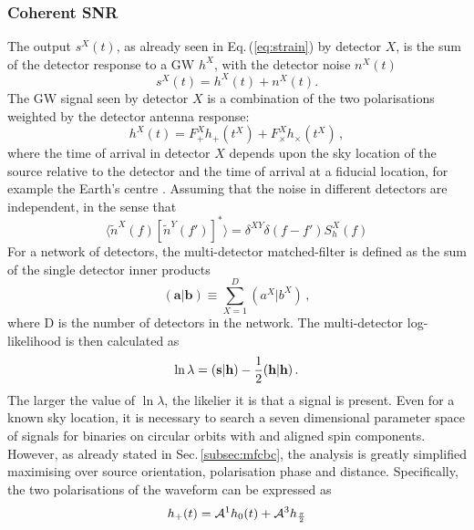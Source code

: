 \documentclass[binding=0.6cm, LaM]{sapthesis}
\begin{document}
\subsubsection{Coherent SNR}	
	The output $s^X(t)$, as already seen in Eq.\,(\ref{eq:strain}) by detector $X$,  
	is the sum of the detector response to a GW $h^X$,
	with the detector noise $n^X(t)$
        \begin{equation}
          s^X(t) = h^X(t) + n^X(t).
        \end{equation}
	The GW signal seen by detector $X$ is a combination of
        the two polarisations weighted by the detector antenna
        response:
        \begin{equation}
          \label{eq:gwsignal}
          h^X(t) = F_{+}^X h_{+}(t^X) + F_{\times}^X h_{\times}(t^X)\,, 
        \end{equation}
        where the time of arrival in detector $X$ depends upon the sky location
        of the source relative to the detector and the time of arrival at a fiducial location,
        for example the Earth’s centre \cite{45}.
	Assuming that the noise in different detectors are independent, in the sense that 
        \begin{equation}
          \langle \tilde{n}^X(f)[ \tilde{n}^Y(f')]^*\rangle = \delta^{XY}\delta(f-f')S_h^X(f)
        \end{equation}
        For a network of detectors, the multi-detector matched-filter
        is defined as the sum of the single detector inner products
        \begin{equation}
          (\textbf{a}|\textbf{b}) \equiv \sum^D_{X=1} (a^X|b^X)\,,
        \end{equation}
        where D is the number of detectors in the network. The multi-detector log-likelihood is then calculated as
        \begin{equation}
          \ln \lambda = (\textbf{s}|\textbf{h}) - {1 \over 2} (\textbf{h}|\textbf{h})\,.
        \end{equation}
        The larger the value of $\ln \lambda$, the likelier it is that a signal is present.
	Even for a known sky location, it is necessary to search a seven 
	dimensional parameter space of signals for binaries on circular orbits with and aligned spin components.
	However, as already stated in Sec.\,\ref{subsec:mfcbc}, the analysis is greatly simplified 
	maximising over source orientation, polarisation phase and distance.
	Specifically, the two polarisations of the waveform can be expressed as 
        \begin{equation}
          h_+(t) = \mathcal{A}^1h_0(t) + \mathcal{A}^3h_{{{\pi} \over {2}}}
        \end{equation}		
\end{document}
